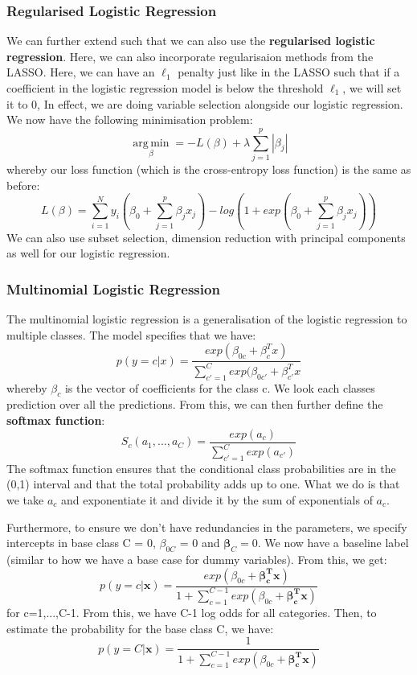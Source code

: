 \documentclass[11pt, oneside]{article}
\theoremstyle{definition}
\DeclareMathOperator*{\argmin}{arg\,min}
\begin{document}
\subsubsection{Regularised Logistic Regression}
We can further extend such that we can also use the \textbf{regularised logistic regression}. Here, we can also incorporate regularisaion methods from the LASSO. Here, we can have an $\ell_1$ penalty just like in the LASSO such that if a coefficient in the logistic regression model is below the threshold $\ell_1$, we will set it to 0, In effect, we are doing variable selection alongside our logistic regression. We now have the following minimisation problem:
$$
\argmin\limits_{\beta} = -L(\beta) + \lambda \sum_{j=1}^{p}|\beta_j|
$$
whereby our loss function (which is the cross-entropy loss function) is the same as before:
$$
L(\beta) = \sum_{i=1}^{N}y_i(\beta_0 + \sum_{j=1}^{p}\beta_jx_j) - log(1 + exp(\beta_0 + \sum_{j=1}^{p}\beta_jx_j))
$$
We can also use subset selection, dimension reduction with principal components as well for our logistic regression.

\subsubsection{Multinomial Logistic Regression}
The multinomial logistic regression is a generalisation of the logistic regression to multiple classes. The model specifies that we have:
$$
p(y=c|x) = \frac{exp(\beta_{0c} + \beta_c^Tx)}{\sum_{c'=1}^{C}exp(\beta_{0c'}+\beta_{c'}^Tx}
$$
whereby $\beta_c$ is the vector of coefficients for the class c. We look each classes prediction over all the predictions. From this, we can then further define the \textbf{softmax function}:
$$
S_c(a_1,...,a_C) = \frac{exp(a_c)}{\sum_{c'=1}^{C}exp(a_{c'})}
$$
The softmax function ensures that the conditional class probabilities are in the (0,1) interval and that the total probability adds up to one. What we do is that we take $a_c$ and exponentiate it and divide it by the sum of exponentials of $a_c$.

Furthermore, to ensure we don't have redundancies in the parameters, we specify intercepts in base class C  = 0, $\beta_{0C}$ = 0 and $\bm{\beta}_{C} = 0$. We now have a baseline label (similar to how we have a base case for dummy variables). From this, we get:
$$
p(y=c|\bm{x}) = \frac{exp(\beta_{0c} + \bm{\beta_{c}^{T}x})}{1 + \sum\limits_{c=1}^{C-1}exp(\beta_{0c} + \bm{\beta_c^{T}x})}
$$
for c=1,...,C-1. From this, we have C-1 log odds for all categories. Then, to estimate the probability for the base class C, we have:
$$
p(y=C|\bm{x}) = \frac{1}{1 + \sum\limits_{c=1}^{C-1}exp(\beta_{0c}+\bm{\beta_c^{T}x})}
$$
\end{document}

